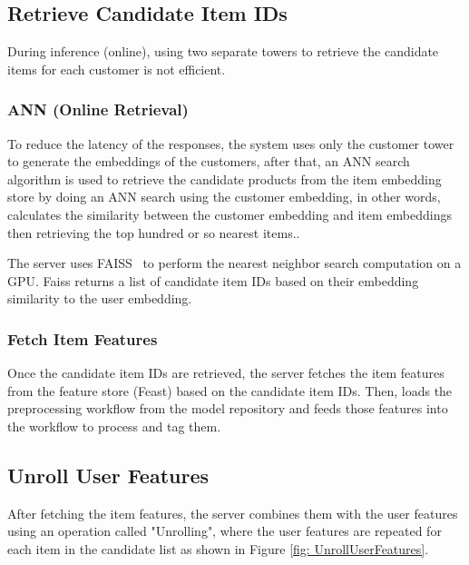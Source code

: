 \subsection{Retrieve Candidate Item IDs}

During inference (online), using two separate towers to retrieve the candidate items for each customer is not efficient.~\cite{NvidiaFeatureStores}

\subsubsection{ANN (Online Retrieval)}

To reduce the latency of the responses, the system uses only the customer tower to generate the embeddings of the customers,
after that, an ANN search algorithm is used to retrieve the candidate products from the item embedding store by doing an ANN search using the customer embedding, 
in other words, calculates the similarity between the customer embedding and item embeddings then retrieving the top hundred or so nearest items..


The server uses FAISS~\cite{Faiss} to perform the nearest neighbor search computation on a GPU.
Faiss returns a list of candidate item IDs based on their embedding similarity to the user embedding.

\subsubsection{Fetch Item Features}

Once the candidate item IDs are retrieved, the server fetches the item features from the feature store (Feast) based on the candidate item IDs.
Then, loads the preprocessing workflow from the model repository and feeds those features into the workflow to process and tag them.

\subsection{Unroll User Features}

After fetching the item features, the server combines them with the user features using an operation called "Unrolling", where the user features are repeated for each item in the candidate list as shown in Figure \ref{fig: UnrollUserFeatures}.

